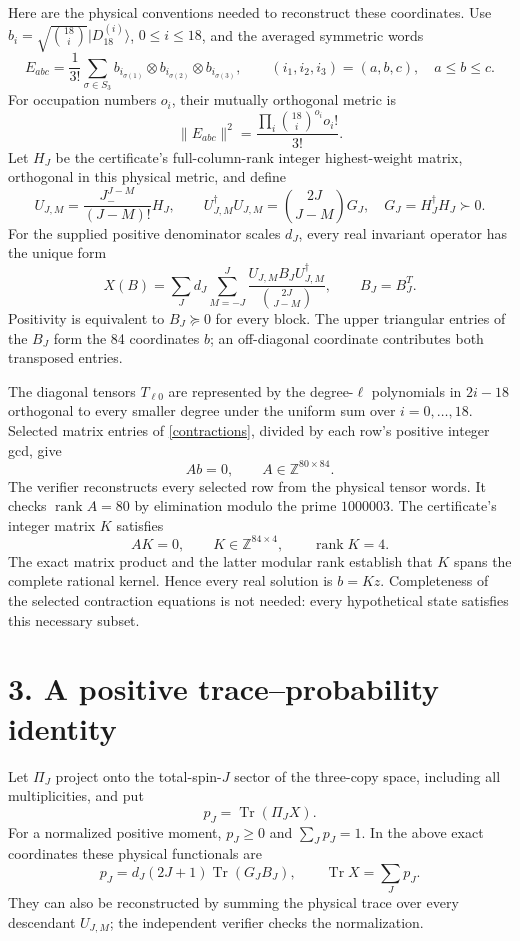 \documentclass[11pt]{article}
\newcommand{\Tr}{\operatorname{Tr}}
\begin{document}
Here are the physical conventions needed to reconstruct these coordinates.
Use $b_i=\sqrt{\binom{18}{i}}|D_{18}^{(i)}\rangle$, $0\le i\le18$, and
the averaged symmetric words
\[
 E_{abc}=\frac1{3!}\sum_{\sigma\in S_3}
 b_{i_{\sigma(1)}}\otimes b_{i_{\sigma(2)}}\otimes b_{i_{\sigma(3)}},
 \qquad (i_1,i_2,i_3)=(a,b,c),\quad a\le b\le c.
\]
For occupation numbers $o_i$, their mutually orthogonal metric is
\[
 \|E_{abc}\|^2=\frac{\prod_i\binom{18}{i}^{o_i}o_i!}{3!}.
\]
Let $H_J$ be the certificate's full-column-rank integer highest-weight
matrix, orthogonal in this physical metric, and define
\[
 U_{J,M}=\frac{J_-^{J-M}}{(J-M)!}H_J,\qquad
 U_{J,M}^{\dagger}U_{J,M}=\binom{2J}{J-M}G_J,
 \quad G_J=H_J^{\dagger}H_J\succ0.
\]
For the supplied positive denominator scales $d_J$, every real invariant
operator has the unique form
\[
 X(B)=\sum_J d_J\sum_{M=-J}^{J}
 \frac{U_{J,M}B_JU_{J,M}^{\dagger}}{\binom{2J}{J-M}},
 \qquad B_J=B_J^T.
\]
Positivity is equivalent to $B_J\succeq0$ for every block. The upper
triangular entries of the $B_J$ form the 84 coordinates $b$; an off-diagonal
coordinate contributes both transposed entries.

The diagonal tensors $T_{\ell0}$ are represented by the degree-$\ell$
polynomials in $2i-18$ orthogonal to every smaller degree under the uniform
sum over $i=0,\ldots,18$. Selected matrix entries of
\eqref{contractions}, divided by each row's positive integer gcd, give
\[
 A b=0,\qquad A\in\mathbb Z^{80\times84}.
\]
The verifier reconstructs every selected row from the physical tensor
words. It checks $\operatorname{rank}A=80$ by elimination modulo the prime
$1000003$. The certificate's integer matrix $K$ satisfies
\[
 AK=0,\qquad K\in\mathbb Z^{84\times4},\qquad
 \operatorname{rank}K=4.
\]
The exact matrix product and the latter modular rank establish that $K$
spans the complete rational kernel. Hence every real solution is $b=Kz$.
Completeness of the selected contraction equations is not needed: every
hypothetical state satisfies this necessary subset.

\section*{3. A positive trace--probability identity}
Let $\Pi_J$ project onto the total-spin-$J$ sector of the three-copy space,
including all multiplicities, and put
\[
 p_J=\Tr(\Pi_JX).
\]
For a normalized positive moment, $p_J\ge0$ and $\sum_Jp_J=1$.
In the above exact coordinates these physical functionals are
\[
 p_J=d_J(2J+1)\Tr(G_JB_J),\qquad \Tr X=\sum_Jp_J.
\]
They can also be reconstructed by summing the physical trace over every
descendant $U_{J,M}$; the independent verifier checks the normalization.
\end{document}
